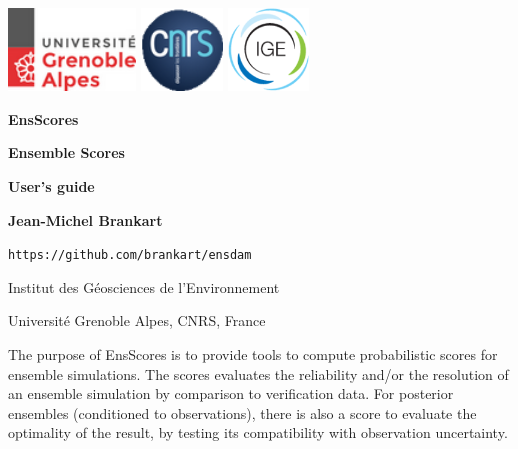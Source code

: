 \documentclass[11pt]{article}
\begin{document}
\pagestyle{empty}

\centerline{
\includegraphics[height=22mm]{Logos/logo_uga.png}
\hspace{5mm}
\includegraphics[height=22mm]{Logos/logo_cnrs.png}
\hfill
\includegraphics[height=22mm]{Logos/logo_ige.png}
}

\vspace{20mm}

\begin{center}

{\Huge\bf EnsScores}

\vspace{10mm}

{\Large\bf Ensemble Scores}

\vspace{10mm}

{\Large\bf User's guide}

\vspace{10mm}

{\large\bf Jean-Michel Brankart}

\vspace{5mm}
{\tt https://github.com/brankart/ensdam}

\vspace{5mm}
{\large Institut des G\'eosciences de l'Environnement}

\vspace{1mm}
{\large Universit\'e Grenoble Alpes, CNRS, France}

\end{center}

\vspace{20mm}
The purpose of EnsScores is to provide tools
to compute probabilistic scores for ensemble simulations.
The scores evaluates the reliability and/or the resolution of an ensemble simulation
by comparison to verification data.
For posterior ensembles (conditioned to observations),
there is also a score to evaluate the optimality of the result,
by testing its compatibility with observation uncertainty.
\end{document}

